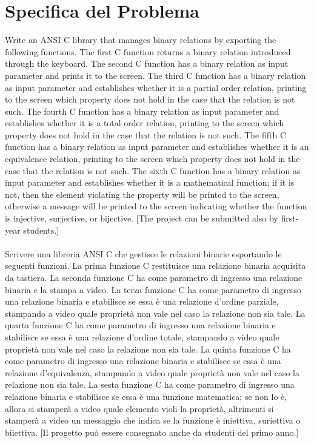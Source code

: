 \documentclass[11pt, a4paper, titlepage, block]{article}
\begin{document}
	\section{Specifica del Problema}
	Write an ANSI C library that manages binary relations by exporting the following functions. The ﬁrst C function returns a binary relation introduced through the keyboard. The second C function has a binary relation as input parameter and prints it to the screen. The third C function has a binary relation as input parameter and establishes whether it is a partial order relation, printing to the screen which property does not hold in the case that the relation is not such. The fourth C function has a binary relation as input parameter and establishes whether it is a total order relation, printing to the screen which property does not hold in the case that the relation is not such. The ﬁfth C function has a binary relation as input parameter and establishes whether it is an equivalence relation, printing to the screen which property does not hold in the case that the relation is not such. The sixth C function has a binary relation as input parameter and establishes whether it is a mathematical function; if it is not, then the element violating the property will be printed to the screen, otherwise a message will be printed to the screen indicating whether the function is injective, surjective, or bijective.
	[The project can be submitted also by ﬁrst-year students.]\\
	\\
	Scrivere una libreria ANSI C che gestisce le relazioni binarie esportando le seguenti funzioni. La prima funzione C restituisce una relazione binaria acquisita da tastiera. La seconda funzione C ha come parametro di ingresso una relazione binaria e la stampa a video. La terza funzione C ha come parametro di ingresso una relazione binaria e stabilisce se essa \`e una relazione d'ordine parziale, stampando a video quale propriet\`a non vale nel caso la relazione non sia tale. La quarta funzione C ha come parametro di ingresso una relazione binaria e stabilisce se essa \`e una relazione d'ordine totale, stampando a video quale propriet\`a non vale nel caso la relazione non sia tale. La quinta funzione C ha come parametro di ingresso una relazione binaria e stabilisce se essa \`e una relazione d'equivalenza, stampando a video quale propriet\`a non vale nel caso la relazione non sia tale. La sesta funzione C ha come parametro di ingresso una relazione binaria e stabilisce se essa \`e una funzione matematica; se non lo \`e, allora si stamper\`a a video quale elemento violi la propriet\`a, altrimenti si stamper\`a a video un messaggio che indica se la funzione \`e iniettiva, suriettiva o biiettiva.
	[Il progetto pu\`o essere consegnato anche da studenti del primo anno.]\\
	\newpage
\end{document}
